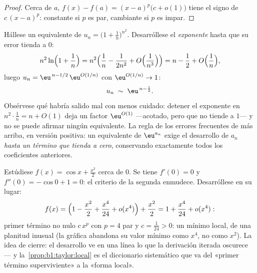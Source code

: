 \begin{proof}
Cerca de $a$, $f(x) - f(a) = (x-a)^p\bigl(c + o(1)\bigr)$ tiene el
signo de $c\,(x-a)^p$: constante si $p$ es par, cambiante si $p$ es impar.
\end{proof}

\begin{example}\label{ex:b1:taylor:expdiscipline}
Hállese un equivalente de $u_n = \bigl(1 + \frac1n\bigr)^{n^2}$.
Desarróllese el \emph{exponente} hasta que su error tienda a $0$:
\[
n^2 \ln\Bigl(1 + \frac1n\Bigr)
= n^2\Bigl(\frac1n - \frac{1}{2n^2} +
O\Bigl(\frac{1}{n^3}\Bigr)\Bigr)
= n - \frac12 + O\Bigl(\frac1n\Bigr),
\]
luego $u_n = \eu^{\,n - 1/2}\,\eu^{O(1/n)}$ con $\eu^{O(1/n)} \to
1$:
\[
u_n \;\sim\; \eu^{\,n - \frac12} .
\]
Obsérvese qué habría salido mal con menos cuidado: detener el
exponente en $n^2\cdot\frac1n = n + O(1)$ deja un factor
$\eu^{O(1)}$ ---acotado, pero que no tiende a $1$--- y no se puede
afirmar ningún equivalente. La regla de los errores frecuentes de más
arriba, en versión positiva: un equivalente de $\eu^{a_n}$ exige el
desarrollo de $a_n$ \emph{hasta un término que tienda a cero},
conservando exactamente todos los coeficientes anteriores.
\end{example}

\begin{example}\label{ex:b1:taylor:flatmin}
Estúdiese $f(x) = \cos x + \frac{x^2}{2}$ cerca de $0$. Se tiene
$f'(0) = 0$ y $f''(0) = -\cos 0 + 1 = 0$: el criterio de la
segunda  enmudece. Desarróllese en su lugar:
\[
f(x) = \Bigl(1 - \frac{x^2}{2} + \frac{x^4}{24} +
o(x^4)\Bigr) + \frac{x^2}{2}
= 1 + \frac{x^4}{24} + o(x^4) :
\]
primer término no nulo $c\,x^p$ con $p = 4$ par y
$c = \frac{1}{24} > 0$: un mínimo local, de una planitud inusual (la
gráfica abandona su valor mínimo como $x^4$, no como $x^2$). La idea
de cierre: el desarrollo ve en una línea lo que la derivación
iterada oscurece --- y la~\cref{prop:b1:taylor:local} es el
diccionario sistemático que va del «primer término superviviente» a
la «forma local».
\end{example}

